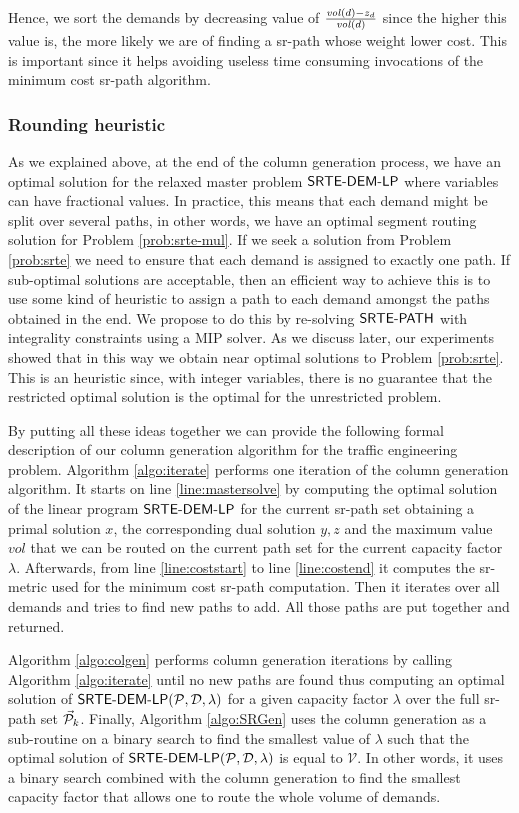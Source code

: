 Hence, we sort the demands by decreasing value of $\frac{\mathit{vol}(d) - z_d}{\mathit{vol}(d)}$ since the higher this value is, the more likely we are of finding a
sr-path whose weight lower cost. This is important since it helps avoiding useless time consuming invocations of the minimum cost sr-path algorithm.

\subsubsection*{Rounding heuristic}

As we explained above, at the end of the column generation process, we have an optimal solution for the relaxed master problem $\textsf{SRTE-DEM-LP}$ where variables can have fractional
values. In practice, this means that each demand might be split over several paths, in other words, we have an optimal segment routing solution for Problem \ref{prob:srte-mul}.
If we seek a solution from Problem \ref{prob:srte} we need to ensure that each demand is assigned to exactly one path. If sub-optimal solutions are acceptable, then an efficient
way to achieve this is to use some kind of heuristic to assign a path to each demand amongst the paths obtained in the end. We propose to do this by re-solving 
$\textsf{SRTE-PATH}$ with integrality constraints using a MIP solver. As we discuss later, our experiments showed that in this way we obtain near optimal solutions to Problem \ref{prob:srte}.
This is an heuristic since, with integer variables, there is no guarantee that the restricted optimal solution is the optimal for the unrestricted problem.

By putting all these ideas together we can provide the following formal description of our column generation algorithm for the traffic engineering problem.
Algorithm \ref{algo:iterate} performs one iteration of the column generation algorithm. It starts on line \ref{line:mastersolve} by computing the optimal solution of the linear program
$\textsf{SRTE-DEM-LP}$ for the current sr-path set obtaining a primal solution $x$, the corresponding dual solution $y, z$ and the maximum value $vol$ that we can be routed on the current path set for the current capacity factor $\lambda$. Afterwards, from line \ref{line:coststart} to line \ref{line:costend} it computes the sr-metric used for the minimum cost sr-path computation. Then it iterates over all
demands and tries to find new paths to add. All those paths are put together and returned.

Algorithm \ref{algo:colgen} performs column generation iterations by calling Algorithm \ref{algo:iterate} until no new paths are found thus computing an optimal solution of 
$\textsf{SRTE-DEM-LP}(\mathcal{P}, \mathcal{D}, \lambda)$ for a given capacity factor $\lambda$ over the full sr-path set $\mathcal{\vec{P}}_k$. Finally, Algorithm \ref{algo:SRGen} uses the column generation as a sub-routine 
on a binary search to find the smallest value of $\lambda$ such that the optimal solution of $\textsf{SRTE-DEM-LP}(\mathcal{P}, \mathcal{D}, \lambda)$ is equal to $\mathcal{V}$. In other words, it uses a binary
search combined with the column generation to find the smallest capacity factor that allows one to route the whole volume of demands.


